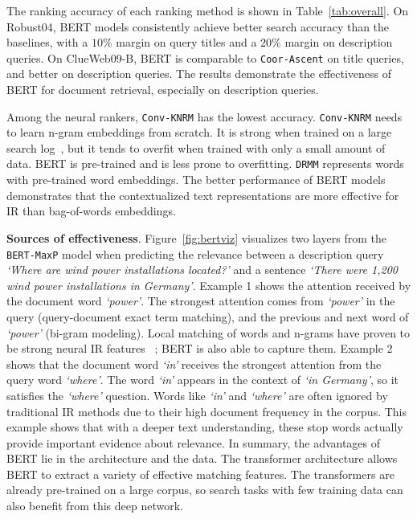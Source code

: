 \documentclass[sigconf]{acmart}
\begin{document}
The ranking accuracy of each ranking method is shown in Table~\ref{tab:overall}.  On Robust04,  BERT models consistently achieve better search accuracy than the baselines, with a $10\%$ margin on query titles and a $20\%$ margin on description queries. On ClueWeb09-B,  BERT is comparable to 
\texttt{Coor-Ascent} on title queries, and better on description queries. The results demonstrate the effectiveness of BERT for document retrieval, especially on description queries. 

Among the neural rankers, \texttt{Conv-KNRM} has the lowest accuracy. \texttt{Conv-KNRM} needs to learn n-gram embeddings from scratch. It is strong when 
trained on a large search log~\cite{dai2018convolutional}, but it tends to overfit when 
trained with only a small amount of data. BERT is pre-trained and is less prone to overfitting. \texttt{DRMM} represents words with pre-trained word embeddings. The better performance of BERT models demonstrates that the contextualized text representations are more effective for IR than bag-of-words embeddings. 

\textbf{Sources of effectiveness}. Figure~\ref{fig:bertviz} visualizes two layers from the \texttt{BERT-MaxP} model when predicting the relevance between a description query \textit{`Where are wind power installations located?'} and a sentence \textit{`There were 1,200 wind power installations in Germany'}. Example 1 shows the attention received by the document word \textit{`power'}. The strongest attention comes from \textit{`power'} in the query (query-document exact term matching), and the previous and next word of \textit{`power'} (bi-gram modeling). 
Local matching of words and n-grams have proven to be strong neural IR features ~\cite{DRMM, dai2018convolutional}; BERT is also able to capture them.
Example 2 shows that the document word \textit{`in'} receives the strongest attention from the query word \textit{`where'}. The word \textit{`in'} appears in the context of \textit{`in Germany'}, so it satisfies the \textit{`where'} question. Words like \textit{`in'} and \textit{`where'} are often ignored by traditional IR methods due to their high document frequency in the corpus. This example shows that with a deeper text understanding, these stop words actually provide important evidence about relevance. 
In summary, the advantages of BERT lie in the architecture and the data. The transformer architecture allows BERT to extract a variety of effective matching features. The transformers are already pre-trained on a large corpus, so search tasks with few training data can also benefit from this deep network.
\end{document}

